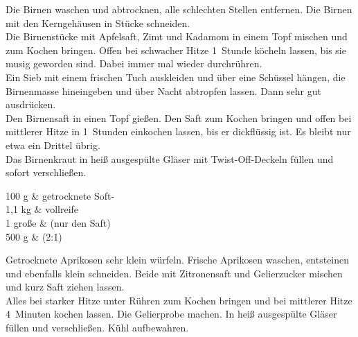       \begin{zubereitung}
        Die Birnen waschen und abtrocknen, alle schlechten Stellen entfernen.
	Die Birnen mit den Kerngehäusen in Stücke schneiden. \\
	Die Birnenstücke mit Apfelsaft, Zimt und Kadamom in einem Topf mischen
	und zum Kochen bringen. Offen bei schwacher Hitze 1~Stunde köcheln
	lassen, bis sie musig geworden sind. Dabei immer mal wieder
	durchrühren. \\
	Ein Sieb mit einem frischen Tuch auskleiden und über eine Schüssel
	hängen, die Birnenmasse hineingeben und über Nacht abtropfen lassen.
	Dann sehr gut ausdrücken. \\
	Den Birnensaft in einen Topf gießen. Den Saft zum Kochen bringen und
	offen bei mittlerer Hitze in 1\breh{}~Stunden einkochen lassen, bis er
	dickflüssig ist. Es bleibt nur etwa ein Drittel übrig. \\
	Das Birnenkraut in heiß ausgespülte Gläser mit Twist-Off-Deckeln
	füllen und sofort verschließen. \\
      \end{zubereitung}


      \begin{zutaten}
        100 g & getrocknete Soft- \\
	1,1 kg & vollreife  \\
	1 große &  (nur den Saft) \\
	500 g &  (2:1) \\
      \end{zutaten}


      \begin{zubereitung}
        Getrocknete Aprikosen sehr klein würfeln. Frische Aprikosen waschen,
	entsteinen und ebenfalls klein schneiden. Beide mit Zitronensaft und
	Gelierzucker mischen und kurz Saft ziehen lassen. \\
	Alles bei starker Hitze unter Rühren zum Kochen bringen und bei
	mittlerer Hitze 4~Minuten kochen lassen. Die Gelierprobe machen. In
	heiß ausgespülte Gläser füllen und verschließen. Kühl aufbewahren. \\
      \end{zubereitung}


